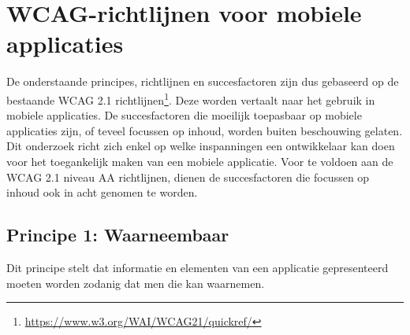 \section{WCAG-richtlijnen voor mobiele applicaties}
\label{sec:WCAGrichtlijnMobiel}
De onderstaande principes, richtlijnen en succesfactoren zijn dus gebaseerd op de bestaande WCAG 2.1 richtlijnen\footnote{\url{https://www.w3.org/WAI/WCAG21/quickref/}}. Deze worden vertaalt naar het gebruik in mobiele applicaties. De succesfactoren die moeilijk toepasbaar op mobiele applicaties zijn, of teveel focussen op inhoud, worden buiten beschouwing gelaten. Dit onderzoek richt zich enkel op welke inspanningen een ontwikkelaar kan doen voor het toegankelijk maken van een mobiele applicatie. Voor te voldoen aan de WCAG 2.1 niveau AA richtlijnen, dienen de succesfactoren die focussen op inhoud ook in acht genomen te worden.
\subsection{Principe 1: Waarneembaar}
\label{sec:waarneembaarWCAG}
Dit principe stelt dat informatie en elementen van een applicatie gepresenteerd moeten worden zodanig dat men die kan waarnemen.


